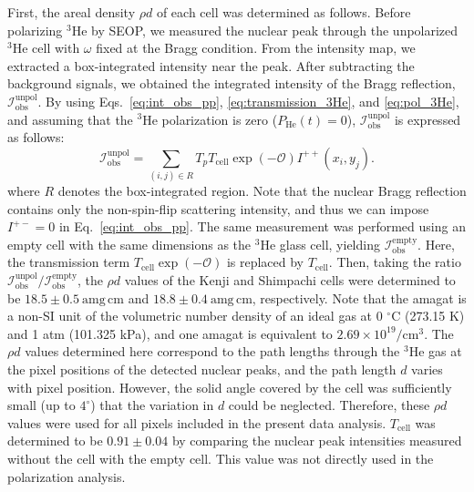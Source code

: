 \documentclass[%
 reprint,
superscriptaddress,
 amsmath,amssymb,
 aps,
floatfix,
]{revtex4-2}
\newcommand{\He}{$^3$He }
\begin{document}
First, the areal density $\rho d$ of each cell was determined as follows.
Before polarizing \He by SEOP, we measured the nuclear peak through the unpolarized \He cell with $\omega$ fixed at the Bragg condition.
From the intensity map, we extracted a box-integrated intensity near the peak.
After subtracting the background signals, we obtained the integrated intensity of the Bragg reflection, $\mathcal{I}_\mathrm{obs}^\mathrm{unpol}$.
By using Eqs.~\ref{eq:int_obs_pp}, \ref{eq:transmission_3He}, and \ref{eq:pol_3He}, and assuming that the \He polarization is zero ($P_\mathrm{He}(t)=0$), $\mathcal{I}_\mathrm{obs}^\mathrm{unpol}$ is expressed as follows:
\begin{equation}
    \mathcal{I}^\mathrm{unpol}_\mathrm{obs}
    =\sum_{(i,j)\in R}
    T_p
    T_\mathrm{cell}
    \exp(-\mathcal{O})
    I^{++}(x_i,y_j)
    .
    \label{eq:unpol}
\end{equation}
where $R$ denotes the box-integrated region.
Note that the nuclear Bragg reflection contains only the non-spin-flip scattering intensity, and thus we can impose $I^{+-} = 0$ in Eq.~\ref{eq:int_obs_pp}.
The same measurement was performed using an empty cell with the same dimensions as the \He glass cell, yielding $\mathcal{I}^\mathrm{empty}_\mathrm{obs}$.
Here, the transmission term $T_\mathrm{cell}\exp(-\mathcal{O})$ is replaced by $T_\mathrm{cell}$.
Then, taking the ratio $\mathcal{I}^\mathrm{unpol}_\mathrm{obs}/\mathcal{I}^\mathrm{empty}_\mathrm{obs}$, the $\rho d$ values of the Kenji and Shimpachi cells were determined to be $18.5 \pm 0.5~\mathrm{amg\,cm}$ and $18.8 \pm 0.4~\mathrm{amg\,cm}$, respectively.
Note that the amagat is a non-SI unit of the volumetric number density of an ideal gas at 0 $^{\circ}$C (273.15 K) and 1 atm (101.325 kPa), and one amagat is equivalent to $2.69\times 10^{19} /\textrm{cm}^3$.
The $\rho d$ values determined here correspond to the path lengths through the \He gas at the pixel positions of the detected nuclear peaks, and the path length $d$ varies with pixel position.
However, the solid angle covered by the cell was sufficiently small (up to $4^\circ$) that the variation in $d$ could be neglected.
Therefore, these $\rho d$ values were used for all pixels included in the present data analysis.
$T_{\mathrm{cell}}$ was determined to be $0.91 \pm 0.04$ by comparing the nuclear peak intensities measured without the cell with the empty cell.
This value was not directly used in the polarization analysis.
\end{document}
